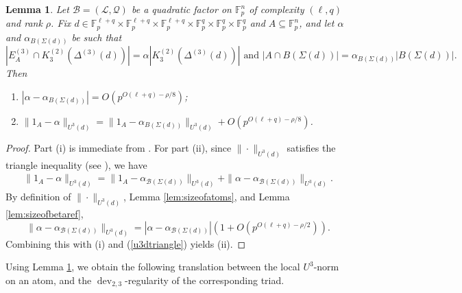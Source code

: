 \documentclass[12pt,oneside,british,a4wide]{amsart}
\newtheorem{lemma}[theorem]{Lemma}
\numberwithin{equation}{section}
\theoremstyle{definition}
\def\F{\mathbb{F}}
\newcommand{\calL}{\mathcal{L}}
\newcommand{\calB}{\mathcal{B}}
\newcommand{\calQ}{\mathcal{Q}}
\def\dev{\operatorname{dev}}
\begin{document}
\begin{lemma}\label{lem:formqr4}
Let $\calB=(\calL,\calQ)$ be a quadratic factor  on $\F_p^n$ of complexity $(\ell,q)$ and rank $\rho$.  Fix $d\in \mathbb{F}_p^{\ell+q}\times \mathbb{F}_p^{\ell+q}\times \mathbb{F}_p^{\ell+q}\times \mathbb{F}_p^{q}\times \mathbb{F}_p^{q}\times \mathbb{F}_p^{q}$ and $A\subseteq \F_p^n$, and let $\alpha$ and $\alpha_{B(\Sigma(d))}$ be such that 
$$
 |E_A^{(3)}\cap K_3^{(2)}(\Delta^{(3)}(d))|=\alpha |K_3^{(2)}(\Delta^{(3)}(d))|\text{ and } |A\cap B(\Sigma(d))|=\alpha_{B(\Sigma(d))}|B(\Sigma(d))|.
$$
Then 
\begin{enumerate}
\item  $|\alpha-\alpha_{B(\Sigma(d))}| =O(p^{O(\ell+q)-\rho/8})$;
\item $\|1_A-\alpha\|_{U^3(d)}=\|1_A-\alpha_{B(\Sigma(d))}\|_{U^3(d)}+O(p^{O(\ell+q)-\rho/8})$.
\end{enumerate}
\end{lemma}
\begin{proof}
Part (i) is immediate from \cite[Lemma A.2 and Proposition C.1]{Terry.2021d}. For part (ii), since $\|\cdot \|_{U^3(d)}$ satisfies the triangle inequality (see \cite{Terry.2021d}), we have 
\begin{align}\label{u3dtriangle}
\|1_A-\alpha\|_{U^3(d)}= \|1_A-\alpha_{\calB(\Sigma(d))}\|_{U^3(d)}+ \|\alpha-\alpha_{\calB(\Sigma(d))}\|_{U^3(d)}.
\end{align}
By definition of $\|\cdot \|_{U^3(d)}$, Lemma \ref{lem:sizeofatoms}, and Lemma \ref{lem:sizeofbetaref}, 
$$
\|\alpha-\alpha_{\calB(\Sigma(d))}\|_{U^3(d)}=|\alpha-\alpha_{\calB(\Sigma(d))}|(1+O(p^{O(\ell+q)-\rho/2})).
$$
Combining this with (i) and (\ref{u3dtriangle}) yields (ii).
\end{proof}


Using Lemma \ref{lem:formqr4}, we obtain the following translation between the local $U^3$-norm on an atom, and the $\dev_{2,3}$-regularity of the corresponding triad.   
\end{document}
